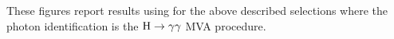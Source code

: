 These figures report results using for the above described selections where the  photon identification is the $\mathrm{H}\to\gamma\gamma$ MVA procedure.


